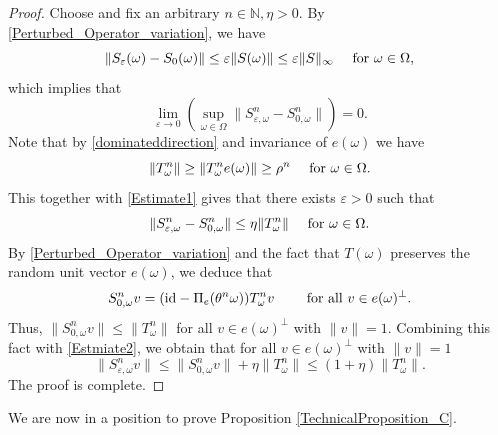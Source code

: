 \documentclass[pdflatex,sn-mathphys-num]{sn-jnl}%
\theoremstyle{thmstyleone}%
\theoremstyle{thmstyletwo}%
\theoremstyle{thmstylethree}%
\newcommand{\N}{\mathbb{N}}
\newcommand{\id}{\hbox{id}}
\newcommand{\eps}{\varepsilon}
\numberwithin{equation}{section}
\begin{document}
\begin{proof}
Choose and fix an arbitrary $n\in\N, \eta>0$. By \eqref{Perturbed_Operator_variation}, we have 
\[
\|S_{\eps}(\omega)-S_{0}(\omega)\|
\leq \eps \|S(\omega)\|\leq \eps \|S\|_{\infty}\quad \hbox{ for } \omega\in\Omega,
\]
which implies that 
\begin{equation}\label{Estimate1}
\lim_{\eps\to 0} \left(\sup_{\omega\in\Omega}\|S_{\eps,\omega}^n- S_{0,\omega}^n\|\right)=0.
\end{equation}
Note that by \eqref{dominateddirection} and invariance of $e(\omega)$ we have 
\[
\|T_{\omega}^n\|\geq \|T_{\omega}^n e(\omega)\|\geq\rho^n\quad\hbox{ for  } \omega\in\Omega.
\]
This together with \eqref{Estimate1} gives that there exists $\eps>0$ such that 
\begin{equation}\label{Estmiate2}
\|S_{\eps,\omega}^n- S_{0,\omega}^n\|
\leq \eta \|T_{\omega}^n\|\quad\hbox{ for } \omega\in\Omega.
\end{equation}
By \eqref{Perturbed_Operator_variation} and the fact that $T(\omega)$ preserves the random unit vector $e(\omega)$, we 
deduce that 
\[
S_{0,\omega}^n v= (\id-\Pi_{e}(\theta^n\omega))T_{\omega}^n v\qquad\hbox{ for all } v\in e(\omega)^{\perp}.
\]
Thus, $\|S_{0,\omega}^nv\|\leq \|T_{\omega}^n\|$ for all $v\in e(\omega)^{\perp}$ with $\|v\|=1$. Combining this fact with \eqref{Estmiate2}, we obtain that for all $v\in e(\omega)^{\perp}$ with $\|v\|=1$
\[
\|S_{\eps,\omega}^nv\|\leq \|S_{0,\omega}^n v\|+\eta\|T_{\omega}^n\|
\leq (1+\eta)\|T_{\omega}^n\|.
\]
The proof is complete.
\end{proof}
%
%
%
We are now in a position to prove Proposition \ref{TechnicalProposition_C}.
%
\end{document}
